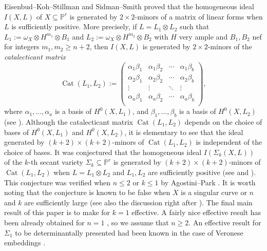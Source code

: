 \documentclass{amsart}
\theoremstyle{plain}
\theoremstyle{definition}
\theoremstyle{remark}
\begin{document}
Eisenbud--Koh--Stillman \cite{EKS1988} and Sidman--Smith \cite{SS2011} proved that the homogeneous ideal $I(X, L)$ of $X \subseteq \mathbb{P}^r$ is generated by $2 \times 2$-minors of a matrix of linear forms when $L$ is sufficiently positive. 
More precisely, if $L = L_1 \otimes L_2$ such that $L_1:=\omega_X \otimes H^{m_1} \otimes B_1$ and $L_2:=\omega_X \otimes H^{m_2} \otimes B_2$ with $H$ very ample and $B_1, B_2$ nef for integers $m_1, m_2 \geq n+2$, then $I(X, L)$ is generated by $2 \times 2$-minors of  the \emph{catalecticant matrix}
$$
\operatorname{Cat}(L_1, L_2) := \begin{pmatrix} 
\alpha_1 \beta_1 & \alpha_1 \beta_2 & \cdots & \alpha_1 \beta_b \\
\alpha_2 \beta_1 & \alpha_2 \beta_2 & \cdots & \alpha_2 \beta_b \\
\vdots & \vdots & \ddots & \vdots \\
\alpha_a \beta_1 & \alpha_a \beta_2 & \cdots & \alpha_a \beta_b \\
\end{pmatrix},
$$
where $\alpha_1, \ldots, \alpha_a$ is a basis of $H^0(X, L_1)$, and $\beta_1, \ldots, \beta_b$ is a basis of $H^0(X, L_2)$ (see \cite[Theroem 1.3]{SS2011}). Although the catalecticant matrix $\operatorname{Cat}(L_1, L_2)$ depends on the choice of bases of $H^0(X, L_1)$ and $H^0(X, L_2)$, it is elementary to see that the ideal generated by $(k+2) \times (k+2)$-minors of  $\operatorname{Cat}(L_1, L_2)$ is independent of the choice of bases. 
It was conjectured that the homogeneous ideal $I(\Sigma_k(X, L))$ of the $k$-th secant variety $\Sigma_k \subseteq \mathbb{P}^r$ is generated by $(k+2) \times (k+2)$-minors of $\operatorname{Cat}(L_1, L_2)$ when $L=L_1 \otimes L_2$ and $L_1, L_2$ are sufficiently positive (see \cite[Remark in page 518]{EKS1988} and \cite[Conjecture 1.2]{SS2011}). This conjecture was verified when $n \leq 2$ or $k \leq 1$ by Agostini--Park \cite[Theorem B]{Agostini.Park.25}. It is worth noting that the conjecture is known to be false when $X$ is a singular curve \cite{BGL13} or $n$ and $k$ are sufficiently large \cite{BBF24} (see also the discussion right after \cite[Conjecture 1.2]{SS2011}). The final main result of this paper is to make \cite[Theorem B]{Agostini.Park.25} for $k=1$ effective. A fairly nice effective result has been already obtained for $n=1$ \cite[Theorem A]{Agostini.Park.25}, so we assume that $n \geq 2$. An effective result for $\Sigma_1$ to be determinantally presented had been known in the case of Veronese embeddings \cite{Raicu}.
\end{document}
